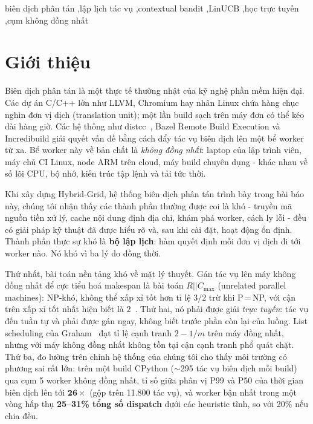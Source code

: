 \documentclass[final,5p,times,twocolumn]{elsarticle}
\begin{document}
\begin{frontmatter}
\begin{abstract}
\end{abstract}

\begin{keyword}
biên dịch phân tán \sep lập lịch tác vụ \sep contextual bandit \sep LinUCB \sep học trực tuyến \sep cụm không đồng nhất
\end{keyword}

\end{frontmatter}

\section{Giới thiệu}
\label{sec:intro}

Biên dịch phân tán là một thực tế thường nhật của kỹ nghệ phần mềm hiện đại. Các dự án C/C++ lớn như LLVM, Chromium hay nhân Linux chứa hàng chục nghìn đơn vị dịch (translation unit); một lần build sạch trên máy đơn có thể kéo dài hàng giờ. Các hệ thống như distcc~\cite{distcc}, Bazel Remote Build Execution và Incredibuild giải quyết vấn đề bằng cách đẩy tác vụ biên dịch lên một bể worker từ xa. Bể worker này về bản chất là \emph{không đồng nhất}: laptop của lập trình viên, máy chủ CI Linux, node ARM trên cloud, máy build chuyên dụng - khác nhau về số lõi CPU, bộ nhớ, kiến trúc tập lệnh và tải tức thời.

Khi xây dựng Hybrid-Grid, hệ thống biên dịch phân tán trình bày trong bài báo này, chúng tôi nhận thấy các thành phần thường được coi là khó - truyền mã nguồn tiền xử lý, cache nội dung định địa chỉ, khám phá worker, cách ly lỗi - đều có giải pháp kỹ thuật đã được hiểu rõ và, sau khi cài đặt, hoạt động ổn định. Thành phần thực sự khó là \textbf{bộ lập lịch}: hàm quyết định mỗi đơn vị dịch đi tới worker nào. Nó khó vì ba lý do đồng thời.

Thứ nhất, bài toán nền tảng khó về mặt lý thuyết. Gán tác vụ lên máy không đồng nhất để cực tiểu hoá makespan là bài toán $R||C_{\max}$ (unrelated parallel machines): NP-khó, không thể xấp xỉ tốt hơn tỉ lệ $3/2$ trừ khi P{\,=\,}NP, với cận trên xấp xỉ tốt nhất hiện biết là $2$~\cite{lenstra1990}. Thứ hai, nó phải được giải \emph{trực tuyến}: tác vụ đến tuần tự và phải được gán ngay, không biết trước phần còn lại của luồng. List scheduling của Graham~\cite{graham1969} đạt tỉ lệ cạnh tranh $2-1/m$ trên máy đồng nhất, nhưng với máy không đồng nhất không tồn tại cận cạnh tranh phổ quát chặt. Thứ ba, đo lường trên chính hệ thống của chúng tôi cho thấy môi trường có phương sai rất lớn: trên một build CPython ($\sim$295 tác vụ biên dịch mỗi build) qua cụm 5 worker không đồng nhất, tỉ số giữa phân vị P99 và P50 của thời gian biên dịch lên tới $\mathbf{26\times}$ (gộp trên 11.800 tác vụ), và worker bận nhất trong một vòng hấp thụ \textbf{25--31\% tổng số dispatch} dưới các heuristic tĩnh, so với 20\% nếu chia đều.
\end{document}
